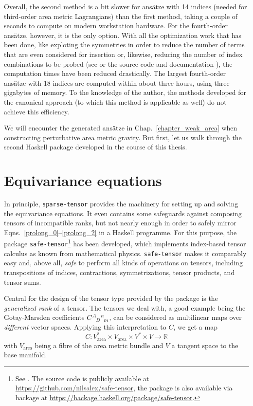 Overall, the second method is a bit slower for ansätze with 14 indices (needed for third-order area metric Lagrangians) than the first method, taking a couple of seconds to compute on modern workstation hardware. For the fourth-order ansätze, however, it is the only option. With all the optimization work that has been done, like exploting the symmetries in order to reduce the number of terms that are even considered for insertion or, likewise, reducing the number of index combinations to be probed (see \cite{Reinhart_2019} or the source code and documentation \cite{Reinhart_2019_sparse-tensor}), the computation times have been reduced drastically. The largest fourth-order ansätze with 18 indices are computed within about three hours, using three gigabytes of memory. To the knowledge of the author, the methods developed for the canonical approach \cite{Schneider_2017} (to which this method is applicable as well) do not achieve this efficiency.

We will encounter the generated ansätze in Chap.\ \ref{chapter_weak_area} when constructing perturbative area metric gravity. But first, let us walk through the second Haskell package developed in the course of this thesis.

\section{Equivariance equations}
In principle, \texttt{sparse-tensor} provides the machinery for setting up and solving the equivariance equations. It even contains some safeguards against composing tensors of incompatible ranks, but not nearly enough in order to safely mirror Eqns.\ \eqref{prolong_0}--\eqref{prolong_2} in a Haskell programme. For this purpose, the package \texttt{safe-tensor}\footnote{See \cite{Alex_2020_safe-tensor}. The source code is publicly available at \url{https://github.com/nilsalex/safe-tensor}, the package is also available via hackage at \url{https://hackage.haskell.org/package/safe-tensor}.} has been developed, which implements index-based tensor calculus as known from mathematical physics. \texttt{safe-tensor} makes it comparably easy and, above all, \emph{safe} to perform all kinds of operations on tensors, including transpositions of indices, contractions, symmetrizations, tensor products, and tensor sums.

Central for the design of the tensor type provided by the package is the \emph{generalized rank} of a tensor. The tensors we deal with, a good example being the Gotay-Marsden coefficients $\gmc{A}{B}{n}{m}$, can be considered as multilinear maps over \emph{different} vector spaces. Applying this interpretation to $C$, we get a map
\begin{equation}
  C \colon V_\text{area}^\ast \times V_\text{area} \times V^\ast \times V \rightarrow \mathbb R
\end{equation}
with $V_\text{area}$ being a fibre of the area metric bundle and $V$ a tangent space to the base manifold.

